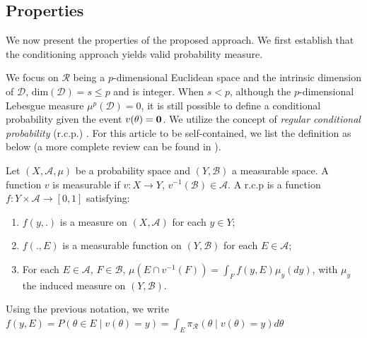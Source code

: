 \documentclass[10pt,fleqn]{article}
\newcommand{\mc}[1]{\mathcal{#1}}
\DeclareMathOperator{\1}{\mathbbm{1}}
\begin{document}
 \subsection{Properties}

We now present the properties of the proposed approach. We first establish
that the conditioning approach yields valid probability measure.

We focus on $\mc R$ being a $p$-dimensional Euclidean space and the
intrinsic dimension of $\mc D$, $\mbox{dim}(\mc D)=s\le p$ and is integer.
When $s<p$, although the
$p$-dimensional Lebesgue measure $\mu^p(\mc D)=0$, it is still possible to define a conditional probability given the event ${v(\theta)=\bf 0}$. We utilize the concept of {\it regular
conditional probability} (r.c.p.)
\citep{kolmogorov1950foundations}. For this article to be self-contained,
we list the definition as below (a more complete review can be found in \cite{leao2004regular}).

Let $(X, \mathscr A, \mu)$ be a probability space and $(Y, \mathscr B)$ a measurable space. A function $v$ is measurable if $v:X\rightarrow Y$, $v^{-1}(\mathscr B)\in \mathscr A$.
A r.c.p is a function
$f: Y\times \mathscr A \rightarrow[0,1]$ satisfying:

\begin{enumerate}
        \item $f(y, .)$ is a measure on $(X,\mathscr A)$ for each $y \in
        Y$;
        \item $f(., E)$ is a measurable function on $(Y,\mathscr B)$ for each $E\in \mathscr A$;
        \item For each $E \in \mathscr A$, $F\in \mathscr B$,
        $\mu(E \cap v^{-1}(F))=\int_{F} f(y, E) \mu_y(dy)$, with
        $\mu_y$ the induced measure on $(Y,\mathscr B)$.
\end{enumerate}

Using the previous notation, we write $f(y,E)= P(\theta\in E\mid
v(\theta)=y)=\int_E \pi_{\mc R}(\theta
\mid v(\theta)=y) d\theta$
\end{document}
